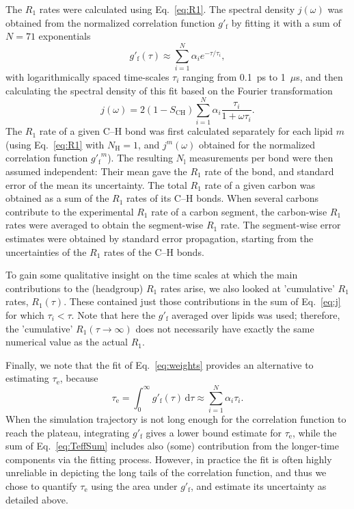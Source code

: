 \documentclass[journal=jpcbfk,manuscript=article,layout=twocolumn]{achemso}
\begin{document}
The $R_{1}$ rates were calculated using Eq.~\eqref{eq:R1}.
%
The spectral density $j(\omega)$ was obtained from the normalized correlation function $g'_\mathrm f$
by fitting it with a sum of $N=71$ exponentials
\begin{equation}
\label{eq:weights}
g'_\mathrm{f}(\tau)\approx\sum_{i=1}^{N}\alpha_{i}e^{-\tau/\tau_{i}},
\end{equation}
with logarithmically spaced time-scales $\tau_{i}$ ranging from 0.1~ps to 1~$\mu$s, 
and then calculating the spectral density of this fit
based on the Fourier transformation\cite{ferreira15}
\begin{equation}
\label{eq:j}
j{(\omega)}=2(1-S_\mathrm{CH})\sum_{i=1}^{N}\alpha_{i}\frac{\tau_{i}}{1+\omega\tau_{i}} .
\end{equation}
%
The $R_{1}$ rate of a given C--H bond was
first calculated separately for each lipid $m$ (using Eq.~\eqref{eq:R1} with $N_\mathrm{H}=1$, and $j^m(\omega)$ obtained for the normalized correlation function ${g'_\mathrm f}^m$). The resulting $N_\mathrm{l}$ measurements per bond were then assumed independent:
Their mean gave the $R_1$ rate of the bond, and 
standard error of the mean its uncertainty.
%
The total $R_1$ rate of a given carbon was obtained as a sum of the $R_1$ rates of its C--H bonds.
%
When several carbons contribute to the experimental $R_1$ rate of a carbon segment, the carbon-wise $R_1$ rates were averaged to obtain the segment-wise $R_1$ rate.
%
The segment-wise error estimates were obtained by standard error propagation, starting from the uncertainties of the $R_1$ rates of the C--H bonds.

To gain some qualitative insight on the time scales at which the main contributions to the (headgroup) $R_1$ rates arise,
we also looked at 'cumulative' $R_1$ rates, $R_1(\tau)$. These
contained just those contributions in the sum of Eq.~\eqref{eq:j} for which $\tau_i<\tau$.
Note that here the $g'_\mathrm{f}$ averaged over lipids was used;
therefore, the 'cumulative' $R_1(\tau\to\infty)$ does not necessarily have exactly
the same numerical value as the actual $R_1$.

Finally, we note that the fit of Eq.~\eqref{eq:weights} provides an alternative
to estimating $\tau_\mathrm{e}$, because
\begin{equation}
\label{eq:TeffSum}
\tau_\mathrm{e}
	=\int_0^\infty\!g'_\mathrm f(\tau)\,\mathrm d\tau
	\approx\sum_{i=1}^{N}\alpha_{i}\tau_{i}.
\end{equation}
When the simulation trajectory is not long enough for the correlation function to reach the plateau, integrating $g'_\mathrm f$ gives a lower bound estimate for $\tau_\mathrm{e}$, while the sum of Eq.~\eqref{eq:TeffSum} includes also (some) contribution from the longer-time components via the fitting process.
However, in practice the fit is often highly unreliable in depicting the long tails of the correlation function, and thus we chose to quantify $\tau_\mathrm{e}$ using the area under $g'_\mathrm f$, and estimate its uncertainty as detailed above.
\end{document}
